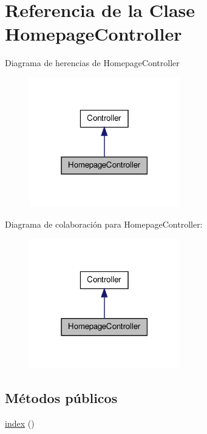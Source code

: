 \hypertarget{class_app_1_1_http_1_1_controllers_1_1_homepage_controller}{\section{\-Referencia de la \-Clase \-Homepage\-Controller}
\label{class_app_1_1_http_1_1_controllers_1_1_homepage_controller}
}


\-Diagrama de herencias de \-Homepage\-Controller
\nopagebreak
\begin{figure}[H]
\begin{center}
\leavevmode
\includegraphics[width=186pt]{class_app_1_1_http_1_1_controllers_1_1_homepage_controller__inherit__graph}
\end{center}
\end{figure}


\-Diagrama de colaboración para \-Homepage\-Controller\-:
\nopagebreak
\begin{figure}[H]
\begin{center}
\leavevmode
\includegraphics[width=186pt]{class_app_1_1_http_1_1_controllers_1_1_homepage_controller__coll__graph}
\end{center}
\end{figure}
\subsection*{\-Métodos públicos}
\begin{DoxyCompactItemize}
\item 
\hyperlink{class_app_1_1_http_1_1_controllers_1_1_homepage_controller_a149eb92716c1084a935e04a8d95f7347}{index} ()
\end{DoxyCompactItemize}


